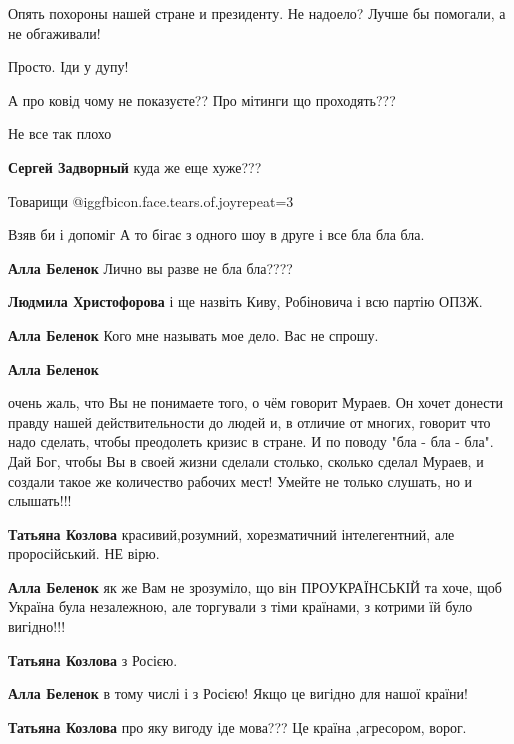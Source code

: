 \begin{itemize}
Опять похороны нашей стране и президенту. Не надоело? Лучше бы помогали, а не обгаживали!

Просто. Іди у дупу!

А про ковід чому не показуєте?? Про мітинги що проходять???

Не все так плохо

\begin{itemize} %
\textbf{Сергей Задворный} куда же еще хуже???
\end{itemize} %

Товарищи @igg{fbicon.face.tears.of.joy}{repeat=3} 

Взяв би і допоміг А то бігає з одного шоу в друге і все бла бла бла.

\begin{itemize} %
\textbf{Алла Беленок}
Лично вы разве не бла бла????

\textbf{Людмила Христофорова} і ще назвіть Киву, Робіновича і всю партію ОПЗЖ.

\textbf{Алла Беленок} Кого мне называть мое дело. Вас не спрошу.

\textbf{Алла Беленок} 

очень жаль, что Вы не понимаете того, о чём говорит Мураев. Он хочет донести
правду нашей действительности до людей и, в отличие от многих, говорит что надо
сделать, чтобы преодолеть кризис в стране. И по поводу "бла - бла - бла". Дай
Бог, чтобы Вы в своей жизни сделали столько, сколько сделал Мураев, и создали
такое же количество рабочих мест! Умейте не только слушать, но и слышать!!!

\begin{itemize} %
\textbf{Татьяна Козлова} красивий,розумний, хорезматичний інтелегентний, але проросійський. НЕ вірю.

\textbf{Алла Беленок} як же Вам не зрозуміло, що він ПРОУКРАЇНСЬКІЙ та хоче, щоб Україна була незалежною, але торгували з тіми країнами, з котрими їй було вигідно!!!

\textbf{Татьяна Козлова} з Росією.

\textbf{Алла Беленок} в тому числі і з Росією! Якщо це вигідно для нашої країни!

\textbf{Татьяна Козлова} про яку вигоду іде мова??? Це країна ,агресором, ворог.
\end{itemize} %


\end{itemize}
\end{itemize}
